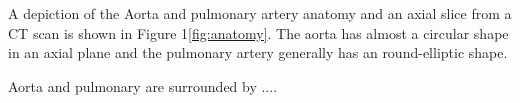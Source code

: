A depiction of the Aorta and pulmonary artery anatomy and an axial slice from a CT scan is shown in Figure 1\ref{fig:anatomy}. The aorta has almost a circular shape in an axial plane and the pulmonary artery generally has an round-elliptic shape.

Aorta and pulmonary are surrounded by  ....


